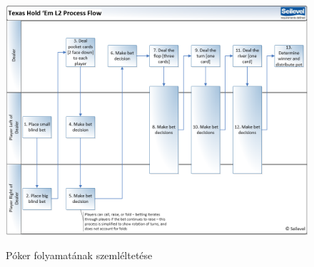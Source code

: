 \begin{figure}[h]
\centering
\includegraphics[scale=0.4]{images/process-flow.png}
\caption{Póker folyamatának szemléltetése}
\cite{process-flow}
\label{fig:process-flow}
\end{figure}

